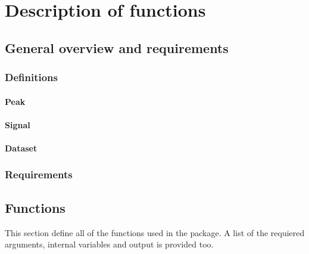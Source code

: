 \chapter{Description of functions}\label{Functions}
\section{General overview and requirements}

\subsection{Definitions}
\subsubsection{Peak}
\subsubsection{Signal}
\subsubsection{Dataset}
\subsection{Requirements}

\section{Functions}
This section define all of the functions used in the package. A list of the requiered arguments, internal variables and output is provided too.






















